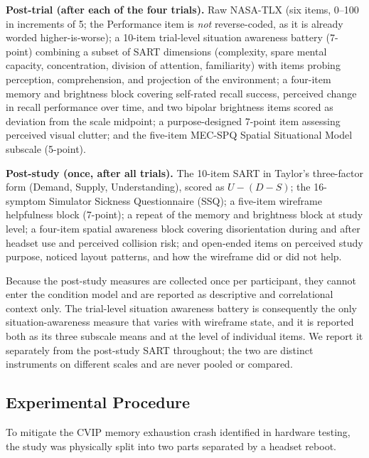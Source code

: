 \textbf{Post-trial (after each of the four trials).} Raw NASA-TLX (six items,
0--100 in increments of 5; the Performance item is \emph{not} reverse-coded,
as it is already worded higher-is-worse); a 10-item trial-level situation
awareness battery (7-point) combining a subset of SART dimensions
(complexity, spare mental capacity, concentration, division of attention,
familiarity) with items probing perception, comprehension, and projection of
the environment; a four-item memory and brightness block covering self-rated
recall success, perceived change in recall performance over time, and two
bipolar brightness items scored as deviation from the scale midpoint; a
purpose-designed 7-point item assessing perceived visual clutter; and the
five-item MEC-SPQ Spatial Situational Model subscale (5-point).

\textbf{Post-study (once, after all trials).} The 10-item SART in Taylor's
three-factor form (Demand, Supply, Understanding), scored as $U - (D - S)$;
the 16-symptom Simulator Sickness Questionnaire (SSQ); a five-item wireframe
helpfulness block (7-point); a repeat of the memory and brightness block at
study level; a four-item spatial awareness block covering disorientation
during and after headset use and perceived collision risk; and open-ended
items on perceived study purpose, noticed layout patterns, and how the
wireframe did or did not help.

Because the post-study measures are collected once per participant, they
cannot enter the condition model and are reported as descriptive and
correlational context only. The trial-level situation awareness battery is
consequently the only situation-awareness measure that varies with wireframe
state, and it is reported both as its three subscale means and at the level of
individual items. We report it separately from the post-study SART throughout;
the two are distinct instruments on different scales and are never pooled or
compared.

\subsection{Experimental Procedure}

To mitigate the CVIP memory exhaustion crash identified in hardware testing,
the study was physically split into two parts separated by a headset reboot.

